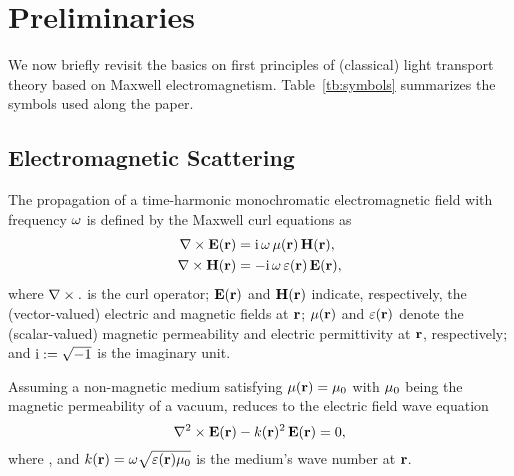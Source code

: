 \section{Preliminaries}
\label{sec:prelim}
%
We now briefly revisit the basics on first principles of (classical) light transport theory based on Maxwell electromagnetism. Table~\ref{tb:symbols} summarizes the symbols used along the paper.


\subsection{Electromagnetic Scattering}
\label{ssec:prelim_maxwells}
%
The propagation of a time-harmonic monochromatic electromagnetic field with frequency $\omega$ is defined by the Maxwell curl equations as
\begin{equation}
    \begin{aligned}
        \nabla\times\mathbf{E}(\mathbf{r}) &= \text{i}\,\omega\,\mu(\mathbf{r})\,\mathbf{H}(\mathbf{r}),\\
        \nabla\times\mathbf{H}(\mathbf{r}) &= -\text{i}\,\omega\,\varepsilon(\mathbf{r})\,\mathbf{E}(\mathbf{r}),
    \end{aligned}
    \label{eq:maxwell}
\end{equation}
%
where $\nabla\times.$ is the curl operator; $\mathbf{E}(\mathbf{r})$ and $\mathbf{H}(\mathbf{r})$ indicate, respectively, the (vector-valued) electric and magnetic fields at $\mathbf{r}$; $\mu(\mathbf{r})$ and $\varepsilon(\mathbf{r})$ denote the (scalar-valued) magnetic permeability and electric permittivity at $\mathbf{r}$, respectively; and $\text{i} := \sqrt{-1}$ is the imaginary unit.

Assuming a non-magnetic medium satisfying $\mu(\mathbf{r}) = \mu_0$ with $\mu_0$ being the magnetic permeability of a vacuum,  reduces to the electric field wave equation
%
\begin{equation}
    \nabla^2\times\mathbf{E}(\mathbf{r}) - k(\mathbf{r})^2\,\mathbf{E}(\mathbf{r}) = 0,
    \label{eq:efieldwave}
\end{equation}
%
where , and $k(\mathbf{r}) = \omega\sqrt{\varepsilon(\mathbf{r})\mu_0}$ is the medium's wave number at $\mathbf{r}$. 

